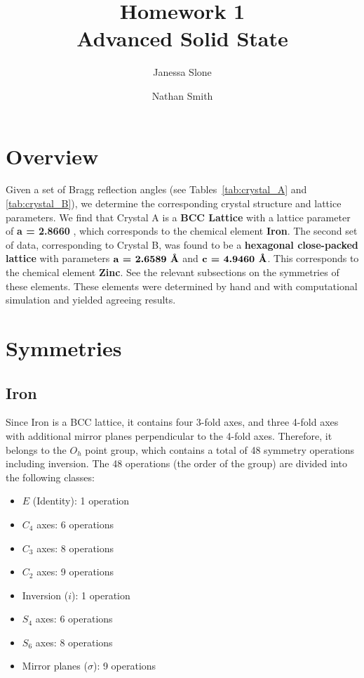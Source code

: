 \documentclass[12pt]{article}
\begin{document}
\title{\textbf{Homework 1}\\[0.5ex] \large Advanced Solid State}
\author{Janessa Slone \and Nathan Smith}
\date{}
\maketitle

\section{Overview}


Given a set of Bragg reflection angles (see Tables~\ref{tab:crystal_A} and \ref{tab:crystal_B}), we determine the corresponding crystal structure and lattice parameters. 
We find that Crystal A is a \textbf{BCC Lattice} with a lattice parameter of \textbf{a = 2.8660 \text{\AA}}, which corresponds to the chemical element \textbf{Iron}. 
The second set of data, corresponding to Crystal B, was found to be a \textbf{hexagonal close-packed lattice} with parameters $\textbf{a = 2.6589\ \text{\AA}}$ and $\textbf{c = 4.9460\ \text{\AA}}$. 
This corresponds to the chemical element \textbf{Zinc}. See the relevant subsections on the symmetries of these elements. 
These elements were determined by hand and with computational simulation and yielded agreeing results. 

\section{Symmetries}

\subsection{Iron}

Since Iron is a BCC lattice, it contains four 3-fold axes, 
and three 4-fold axes with additional mirror planes perpendicular to the 4-fold axes. 
Therefore, it belongs to the $O_h$ point group, which contains a total of 48 symmetry operations including inversion. The 48 operations (the order of the group) are divided into the following classes:
\begin{itemize}
    \item $E$ (Identity): 1 operation
    \item $C_{4}$ axes: 6 operations
    \item $C_{3}$ axes: 8 operations
    \item $C_{2}$ axes: 9 operations
    \item Inversion ($i$): 1 operation
    \item $S_{4}$ axes: 6 operations
    \item $S_{6}$ axes: 8 operations
    \item Mirror planes ($\sigma$): 9 operations
\end{itemize}
\end{document}
